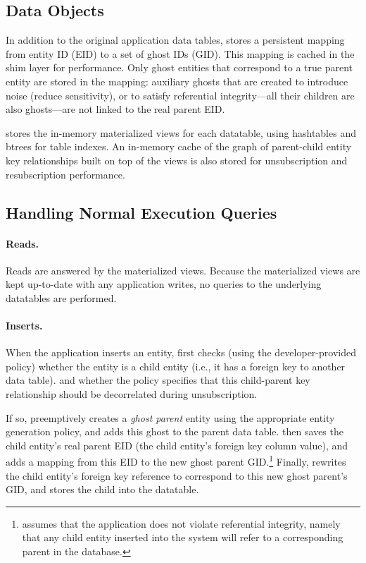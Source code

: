 \subsection{Data Objects}
In addition to the original application data tables, \sys{} stores a persistent mapping from entity
ID (EID) to a set of ghost IDs (GID). This mapping is cached in the shim layer for performance. Only
ghost entities that correspond to a true parent entity are stored in the mapping: auxiliary ghosts that are
created to introduce noise (reduce sensitivity), or to satisfy referential integrity---all their
children are also ghosts---are not linked to the real parent EID.

\sys{} stores the in-memory materialized views for each datatable, using hashtables and btrees for
table indexes. An in-memory cache of the graph of parent-child entity key relationships built on
top of the views is also stored for unsubscription and resubscription performance.

\subsection{Handling Normal Execution Queries}
\paragraph{Reads.}
Reads are answered by the materialized views. Because the materialized views are kept up-to-date with any application
writes, no queries to the underlying datatables are performed.

\paragraph{Inserts.}
When the application inserts an entity, \sys{} first checks (using the developer-provided policy) whether
the entity is a child entity (i.e., it has a foreign key to another data table). 
and whether the policy specifies that this child-parent key
relationship should be decorrelated during unsubscription. 

If so, \sys{} preemptively creates a \emph{ghost parent} entity using the appropriate entity
generation policy, and adds this ghost to the parent data table. \sys{} then saves the child
entity's real parent EID (the child entity's foreign key column value), and adds a mapping from this
EID to the new ghost parent GID.\footnote{\sys{} assumes that the application does not violate
referential integrity, namely that any child entity inserted into the system will refer to a
corresponding parent in the database.} Finally, \sys{} rewrites the child entity's foreign key
reference to correspond to this new ghost parent's GID, and stores the child into the datatable.

